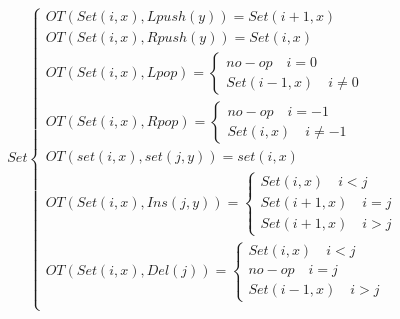 \documentclass[a4paper,UTF8]{article}
\begin{document}
\begin{equation}
\begin{aligned}
Set \begin{cases}
OT(Set(i,x),Lpush(y))=
{Set(i+1,x)}\\
OT(Set(i,x),Rpush(y))=
{Set(i,x)}\\
OT(Set(i,x),Lpop)=\begin{cases}
{no-op} \quad i=0\\
{Set(i-1,x)} \quad i \neq 0 \end{cases}\\
OT(Set(i,x),Rpop)= \begin{cases}
{no-op} \quad i=-1\\
{Set(i,x)} \quad i \neq -1 \end{cases} \\
OT(set (i,x), set (j,y)) =
	{set (i,x)}\\
OT(Set(i,x),Ins(j,y))=\begin{cases}
{Set(i,x)}  \quad i<j\\
{Set(i+1,x)} \quad  i=j \\
{Set(i+1,x)} \quad  i>j \end{cases} \\
OT(Set(i,x),Del(j))=\begin{cases}
{Set(i,x)} \quad i<j\\
{no-op} \quad  i=j\\
{Set(i-1,x)} \quad i>j \end{cases} \\
\end{cases}
\end{aligned}
\end{equation}
\end{document}

